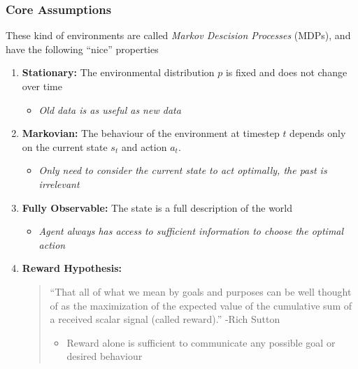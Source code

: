 \documentclass[10pt,a4paper, handout]{beamer}
\begin{document}
\begin{frame}
\frametitle{Core Assumptions}

These kind of environments are called \textit{Markov Descision Processes} (MDPs),
and have the following ``nice'' properties
\begin{enumerate}
	\pause
		\item \textbf{Stationary:} The environmental distribution $p$
		is fixed and does not change over time
		\begin{itemize}
			\item \textit{Old data is as useful as new data}
		\end{itemize}
		\pause
		\item \textbf{Markovian:} The behaviour of the environment
		at timestep $t$ depends only on the current state $s_t$
		and action $a_t$. 
		\begin{itemize}
			\item \textit{Only need to consider the current state to act optimally,
			the past is irrelevant}
		\end{itemize}
	\pause
		\item \textbf{Fully Observable:} The state is a full description
		of the world
		\begin{itemize}
			\item \textit{Agent always has access to sufficient information to 
			choose the optimal action}
		\end{itemize}
	\pause
		\item \textbf{Reward Hypothesis:} 
		\begin{quote}
			``That all of what we mean by goals and purposes can be well thought of as
			the maximization of the expected value of the cumulative sum of a received
			scalar signal (called reward).'' -Rich Sutton
			\begin{itemize}
				\item Reward alone is sufficient to communicate any possible goal
				or desired behaviour
			\end{itemize}
		\end{quote}
\end{enumerate}

\end{frame}
\end{document}
